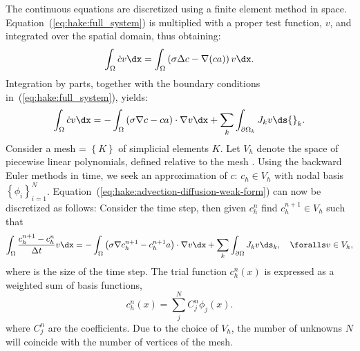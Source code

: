 The continuous equations are discretized using a finite element method
in space. Equation~(\ref{eq:hake:full_system}) is multiplied with a proper
test function, $v$, and integrated over the spatial domain, thus
obtaining:
\begin{equation}
  \label{eq:hake:advection-diffusion-weak-form-0}
  \int_\Omega\dot{c}v \dx = \int_\Omega \left(\sigma\Delta c-\nabla(ca)\right) v \dx.
\end{equation}
Integration by parts, together with the boundary conditions
in~(\ref{eq:hake:full_system}), yields:
\begin{equation}
  \label{eq:hake:advection-diffusion-weak-form}
  \int_\Omega\dot{c}v \dx = -\int_\Omega \left(\sigma\nabla c-ca\right)\cdot\nabla v \dx + \sum_k\int_{\partial\Omega_k} J_kv \ds{}_k.
\end{equation}
Consider a mesh \T = $\left\{K\right\}$ of simplicial elements
$K$. Let $V_h$ denote the space of piecewise linear polynomials,
defined relative to the mesh \T. Using the backward Euler methods in
time, we seek an approximation of $c$: $c_h\in V_h$ with nodal basis
$\left\{\phi_i\right\}^N_{i=1}$. Equation~(\ref{eq:hake:advection-diffusion-weak-form})
can now be discretized as follows: Consider the \nth time step, then
given $c_h^n$ find $c_h^{n+1} \in V_h$ such that
\begin{equation}
  \label{eq:hake:advection-diffusion-weak-discrete-form}
  \int_{\Omega} \frac{c_h^{n+1}-c_h^{n}}{\Dt}v \dx = -\int_{\Omega} \left(\sigma\nabla c_h^{n+1}-c_h^{n+1}a\right)\cdot\nabla v \dx + \sum_k\int_{\partial\Omega} J_kv\ds_{k},\quad\foralls v \in V_h,
\end{equation}
where \Dt is the size of the time step. The trial function $c^n_h(x)$
is expressed as a weighted sum of basis functions,
\begin{equation}
  \label{eq:hake:discrete-solution}
  c^n_h(x) = \sum^N_j C_j^n\phi_j(x).
\end{equation}
where $C_j^n$ are the coefficients. Due to the choice of $V_h$, the
number of unknowns $N$ will coincide with the number of vertices of
the mesh.



